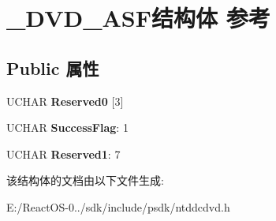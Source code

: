 \hypertarget{struct___d_v_d___a_s_f}{}\section{\+\_\+\+D\+V\+D\+\_\+\+A\+S\+F结构体 参考}
\label{struct___d_v_d___a_s_f}
\subsection*{Public 属性}
\begin{DoxyCompactItemize}
\item 
\mbox{\label{struct___d_v_d___a_s_f_adeffc586708b32a3781a77aadee50256}} 
U\+C\+H\+AR {\bfseries Reserved0} \mbox{[}3\mbox{]}
\item 
\mbox{\label{struct___d_v_d___a_s_f_a1a56da5609e98c4be8de2a9c0868748e}} 
U\+C\+H\+AR {\bfseries Success\+Flag}\+: 1
\item 
\mbox{\label{struct___d_v_d___a_s_f_a587c2f6939b6280f8e10a2e96ff75772}} 
U\+C\+H\+AR {\bfseries Reserved1}\+: 7
\end{DoxyCompactItemize}


该结构体的文档由以下文件生成\+:\begin{DoxyCompactItemize}
\item 
E\+:/\+React\+O\+S-\/0../sdk/include/psdk/ntddcdvd.\+h\end{DoxyCompactItemize}
